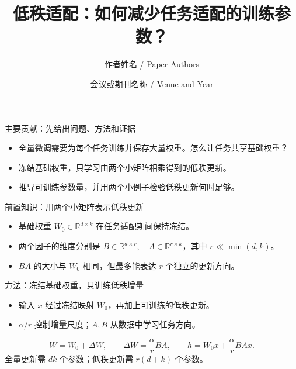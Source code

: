 \documentclass[aspectratio=169,t]{beamer}
\title{低秩适配：如何减少任务适配的训练参数？}
\author{作者姓名 / Paper Authors}
\date{会议或期刊名称 / Venue and Year}
\newif\ifPaperTalkProblemIntro
\newcommand{\DemoFactors}{B\in\mathbb{R}^{d\times r},\quad A\in\mathbb{R}^{r\times k}}
\newcommand{\DemoUpdate}{\Delta W=\frac{\alpha}{r}BA}
\newcommand{\DemoForward}{h=W_0x+\frac{\alpha}{r}BAx}
\begin{document}
\PaperTalkTitleFrame

\ifPaperTalkProblemIntro
\begin{frame}{问题引入：每个任务都需要一整套新权重吗？}
  \begin{itemize}
    \item 同一个基础模型要适配多个任务，例如文本分类和摘要。
    \item 全量微调会更新全部权重。仅一个 $1000\times1000$ 权重矩阵，
      就需要为每个任务保存一百万个权重。
    \item 我们能否共享原始权重，只为每个任务训练并保存少量参数？
  \end{itemize}
\end{frame}
\fi

\begin{frame}{主要贡献：先给出问题、方法和证据}
  \begin{itemize}
    \item 全量微调需要为每个任务训练并保存大量权重。怎么让任务共享基础权重？
    \item 冻结基础权重，只学习由两个小矩阵相乘得到的低秩更新。
    \item 推导可训练参数量，并用两个小例子检验低秩更新何时足够。
  \end{itemize}
\end{frame}

\begin{frame}{前置知识：用两个小矩阵表示低秩更新}
  \begin{itemize}
    \item 基础权重 $W_0\in\mathbb{R}^{d\times k}$ 在任务适配期间保持冻结。
    \item 两个因子的维度分别是 $\DemoFactors$，其中 $r\ll\min(d,k)$。
    \item $BA$ 的大小与 $W_0$ 相同，但最多能表达 $r$ 个独立的更新方向。
  \end{itemize}
\end{frame}

\begin{frame}{方法：冻结基础权重，只训练低秩增量}
  \PaperTalkFormulaRecap[前置：低秩因子]{%
    $\DemoFactors$}
  \begin{itemize}
    \item 输入 $x$ 经过冻结映射 $W_0$，再加上可训练的低秩更新。
    \item $\alpha/r$ 控制增量尺度；$A,B$ 从数据中学习任务方向。
  \end{itemize}
  \[
    W=W_0+\Delta W,\qquad \DemoUpdate,\qquad \DemoForward.
  \]
  {全量更新需 $dk$ 个参数；低秩更新需 $r(d+k)$ 个参数。}
\end{frame}
\end{document}
